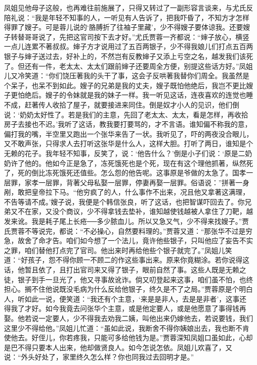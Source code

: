 \begin{parag}
    凤姐见他母子这般，也再难往前施展了，只得又转过了一副形容言谈来，与尤氏反陪礼说：“我是年轻不知事的人，一听见有人告诉了，把我吓昏了，不知方才怎样得罪了嫂子。可是蓉儿说的‘胳膊折了往袖子里藏’，少不得嫂子要体谅我。还要嫂子转替哥哥说了，先把这官司按下去才好。”尤氏贾蓉一齐都说：“婶子放心，横竖一点儿连累不著叔叔。婶子方才说用过了五百两银子，少不得我娘儿们打点五百两银子与婶子送过去，好补上的，不然岂有反教婶子又添上亏空之名，越发我们该死了。但还有一件，老太太、太太们跟前婶子还要周全方便，别提这些话方好。”凤姐儿又冷笑道：“你们饶压著我的头干了事，这会子反哄著我替你们周全。我虽然是个呆子，也呆不到如此。嫂子的兄弟是我的丈夫，嫂子既怕他绝后，我岂不更比嫂子更怕绝后。嫂子的令妹就是我的妹子一样。我一听见这话，连夜喜欢的连觉也睡不成，赶著传人收拾了屋子，就要接进来同住。倒是奴才小人的见识，他们倒说：‘奶奶太好性了。若是我们的主意，先回了老太太、太太，看是怎样，再收拾房子去接也不迟。’我听了这话，教我要打要骂的，才不言语。谁知偏不称我的意，偏打我的嘴，半空里又跑出一个张华来告了一状。我听见了，吓的两夜没合眼儿，又不敢声张，只得求人去打听这张华是什么人，这样大胆。打听了两日，谁知是个无赖的花子。我年轻不知事，反笑了，说：‘他告什么？’倒是小子们说：‘原是二奶奶许了他的。他如今正是急了，冻死饿死也是个死，现在有这个理他抓著，纵然死了，死的倒比冻死饿死还值些。怎么怨的他告呢。这事原是爷做的太急了。国孝一层罪，家孝一层罪，背著父母私娶一层罪，停妻再娶一层罪。俗语说：”拼著一身剐，敢把皇帝拉下马。“他穷疯了的人，什么事作不出来，况且他又拿著这满理，不告等请不成。’嫂子说，我便是个韩信张良，听了这话，也把智谋吓回去了。你兄弟又不在家，又没个商议，少不得拿钱去垫补，谁知越使钱越被人拿住了刀靶，越发来讹。我是耗子尾上长疮──多少脓血儿。所以又急又气，少不得来找嫂子。”贾氏贾蓉不等说完，都说：“不必操心，自然要料理的。”贾蓉又道：“那张华不过是穷急，故舍了命才告。咱们如今想了一个法儿，竟许他些银子，只叫他应了妄告不实之罪，咱们替他打点完了官司。他出来时再给他些个银子就完了。”凤姐儿笑道：“好孩子，怨不得你顾一不顾二的作这些事出来。原来你竟糊涂。若你说得这话，他暂且依了，且打出官司来又得了银子，眼前自然了事。这些人既是无赖之徒，银子到手一旦光了，他又寻事故讹诈。倘又叨登起来这事，咱们虽不怕，也终担心。搁不住他说既没毛病为什么反给他银子，终久是不了之局。”贾蓉原是个明白人，听如此一说，便笑道：“我还有个主意，‘来是是非人，去是是非者’，这事还得我了才好。如今我竟去问张华个主意，或是他定要人，或是他愿意了事得钱再娶。他若说一定要人，少不得我去劝我二姨，叫他出来仍嫁他去，若说要钱，我们这里少不得给他。”凤姐儿忙道：“虽如此说，我断舍不得你姨娘出去，我也断不肯使他去。好侄儿，你若疼我，只能可多给他钱为是。”贾蓉深知凤姐口虽如此，心却是巴不得只要本人出来，他却做贤良人。如今怎说怎依。凤姐儿欢喜了，又说：“外头好处了，家里终久怎么样？你也同我过去回明才是。” 
\end{parag}
